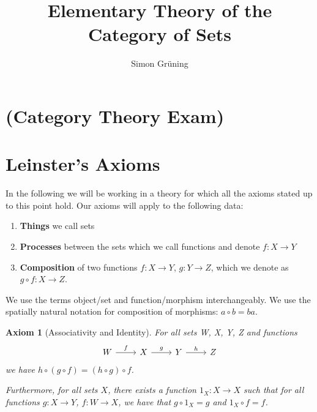 


\title{Elementary Theory of the Category of Sets}
\author{Simon Gr\"uning}
\address[Simon Gr\"uning]{University of Zurich, R\"{a}mistrasse 71, 8006 Zurich}

\newtheorem{axiom}{Axiom}
\setcounter{axiom}{-1}

\maketitle

\section*{(Category Theory Exam)}


\clearpage


\section{Leinster's Axioms}

\begin{remark}
In the following we will be working in a theory for which all the axioms stated up to this point hold. Our axioms will apply to the following data:

\begin{enumerate}
\item \textbf{Things} we call sets
\item \textbf{Processes} between the sets which we call functions and denote $f: X \longrightarrow Y$
\item \textbf{Composition} of two functions $f: X \longrightarrow Y$, $g: Y \longrightarrow Z$, which we denote as $g \circ f: X \longrightarrow Z$.
\end{enumerate}

We use the terms object/set and function/morphism interchangeably. We use the spatially natural notation for composition of morphisms: $a \circ b = ba$.
\end{remark}

\begin{axiom}[Associativity and Identity]
For all sets W, X, Y, Z and functions
\begin{equation*}
\begin{tikzcd}
W \arrow[r,"f"] & X \arrow[r,"g"] & Y \arrow[r,"h"] & Z 
\end{tikzcd}
\end{equation*}
we have $h \circ (g \circ f) = (h \circ g) \circ f$. 

Furthermore, for all sets $X$, there exists a function $1_{X}: X \longrightarrow X$ such that for all functions $g: X \longrightarrow Y$, $f: W \longrightarrow X$, we have that $g \circ 1_{X} = g$ and $1_{X} \circ f = f$.
\end{axiom}

